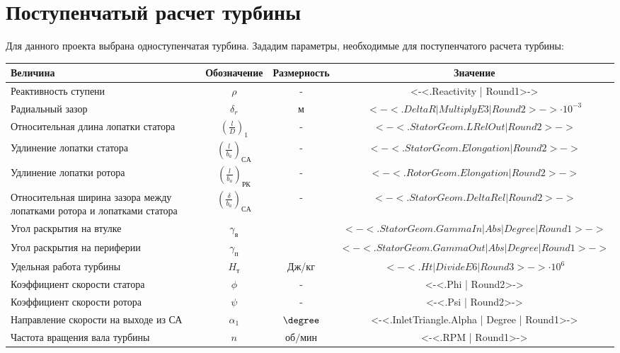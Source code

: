 \section{Поступенчатый расчет турбины}
Для данного проекта выбрана одноступенчатая турбина.
Зададим параметры, необходимые для поступенчатого расчета турбины:

\begin{center}
	\begin{longtable}{|p{4cm}|c|c|c|}
		\hline
		\textbf{Величина} & \textbf{Обозначение} & \textbf{Размерность} & \textbf{Значение} \\ \hline
			Реактивность ступени & $\rho$ & - & <-<.Reactivity | Round1>->  \\ \hline
			Радиальный зазор & $\delta_r$ & м & $<-<.DeltaR | MultiplyE3 | Round2>-> \cdot 10^{-3}$ \\ \hline
			Относительная длина лопатки статора & $\left( \frac{l}{D} \right)_1$ & - & $<-<.StatorGeom.LRelOut | Round2>->$ \\ \hline
			Удлинение лопатки статора & $\left( \frac{l}{b_a} \right)_{СА}$ & - & $<-<.StatorGeom.Elongation | Round2>->$ \\ \hline
			Удлинение лопатки ротора & $\left( \frac{l}{b_a} \right)_{РК}$ & - & $<-<.RotorGeom.Elongation | Round2>->$ \\ \hline
			Относительная ширина зазора между лопатками ротора и лопатками статора & $\left( \frac{\delta}{b_a} \right)_{СА}$ & - & $<-<.StatorGeom.DeltaRel | Round2>->$ \\ \hline
			Угол раскрытия на втулке & $\gamma_{в}$ & \degree & $<-<.StatorGeom.GammaIn | Abs | Degree | Round1>->$ \\ \hline
			Угол раскрытия на периферии & $\gamma_{п}$ & \degree & $<-<.StatorGeom.GammaOut | Abs | Degree | Round1>->$ \\ \hline
			Удельная работа турбины & $H_т$ & Дж/кг & $<-<.Ht | DivideE6 | Round3>-> \cdot 10^6$ \\ \hline
			Коэффициент скорости статора & $\phi$ & - & <-<.Phi | Round2>-> \\ \hline
			Коэффициент скорости ротора & $\psi$ & - & <-<.Psi | Round2>-> \\ \hline
			Направление скорости на выходе из СА & $\alpha_1$ & $\degree$ & <-<.InletTriangle.Alpha | Degree | Round1>-> \\ \hline
			Частота вращения вала турбины & $n$ & $об/мин$ & <-<.RPM | Round1>-> \\ \hline
	\end{longtable}
\end{center}

